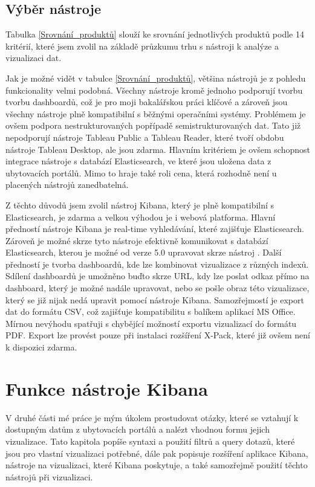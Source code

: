 \documentclass[czech,BP]{thesiskiv}
\begin{document}
\renewcommand{\arraystretch}{1}

\section{Výběr nástroje}
Tabulka \ref{Srovnání_produktů} slouží ke srovnání jednotlivých produktů podle 14 kritérií, které jsem zvolil na základě průzkumu trhu s nástroji k analýze a vizualizaci dat.


Jak je možné vidět v tabulce \ref{Srovnání_produktů}, většina nástrojů je z pohledu funkcionality velmi podobná. Všechny nástroje kromě jednoho podporují tvorbu tvorbu dashboardů, což je pro moji bakalářskou práci klíčové a zároveň jsou všechny nástroje plně kompatibilní s běžnými operačními systémy. Problémem je ovšem podpora nestrukturovaných popřípadě semistrukturovaných dat. Tato již nepodporují nástroje Tableau Public a Tableau Reader, které tvoří obdobu nástroje Tableau Desktop, ale jsou zdarma. Hlavním kritériem je ovšem schopnost integrace nástroje s databází Elasticsearch, ve které jsou uložena data z ubytovacích portálů. Mimo to hraje také roli cena, která rozhodně není u placených nástrojů zanedbatelná. 


Z těchto důvodů jsem zvolil nástroj Kibana, který je plně kompatibilní s Elasticsearch, je zdarma a velkou výhodou je i webová platforma. Hlavní předností nástroje Kibana je real-time vyhledávání, které zajišťuje Elasticsearch. Zároveň je možné skrze tyto nástroje efektivně komunikovat s databází Elasticsearch, kterou je možné od verze 5.0 upravovat skrze nástroj . Další předností je tvorba dashboardů, kde lze kombinovat vizualizace z různých indexů. Sdílení dashboardů je umožněno buďto skrze URL, kdy lze poslat odkaz přímo na dashboard, který je možné nadále upravovat, nebo se pošle obraz této vizualizace, který se již nijak nedá upravit pomocí nástroje Kibana. Samozřejmostí je export dat do formátu CSV, což zajišťuje kompatibilitu s balíkem aplikací MS Office. Mírnou nevýhodu spatřuji s chybějící možností exportu vizualizací do formátu PDF. Export lze provést pouze při instalaci rozšíření X-Pack, které již ovšem není k dispozici zdarma.
\chapter{Funkce nástroje Kibana}
\label{Funkce_nástroje}
V druhé části mé práce je mým úkolem prostudovat otázky, které se vztahují k dostupným datům z ubytovacích portálů a nalézt vhodnou formu jejich vizualizace. Tato kapitola popíše syntaxi a použití filtrů a query dotazů, které jsou pro vlastní vizualizaci potřebné, dále pak popisuje rozšíření aplikace Kibana, nástroje na vizualizaci, které Kibana poskytuje, a také samozřejmě použití těchto nástrojů při vizualizaci.
\end{document}
